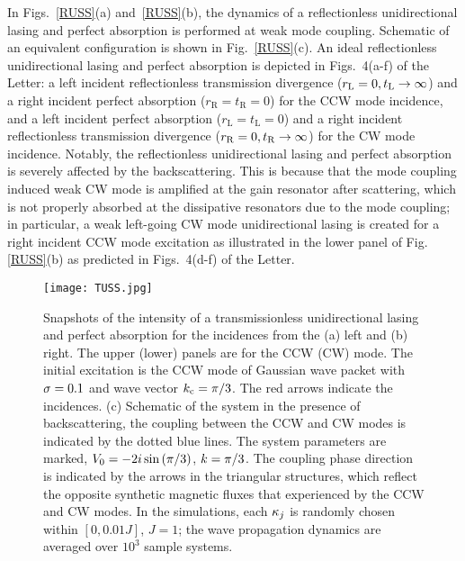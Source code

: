\documentclass[prl,showpacs,superscriptaddress,twocolumn]{revtex4-1}
\begin{document}
\begin{widetext}
In Figs.~\ref{RUSS}(a) and~\ref{RUSS}(b), the dynamics of a
reflectionless unidirectional lasing and perfect absorption is performed at
weak mode coupling. Schematic of an equivalent configuration is shown in
Fig.~\ref{RUSS}(c). An ideal reflectionless unidirectional
lasing and perfect absorption is depicted in Figs.~4(a-f) of the Letter: a
left incident reflectionless transmission divergence ($r_{\mathrm{L}}=0,t_{%
\mathrm{L}}\rightarrow \infty $) and a right incident perfect absorption ($%
r_{\mathrm{R}}=t_{\mathrm{R}}=0$) for the CCW mode incidence, and a left
incident perfect absorption ($r_{\mathrm{L}}=t_{\mathrm{L}}=0$) and a right
incident reflectionless transmission divergence ($r_{\mathrm{R}}=0,t_{%
\mathrm{R}}\rightarrow \infty $) for the CW mode incidence. Notably, the
reflectionless unidirectional lasing and perfect absorption is severely
affected by the backscattering.
This is because that the mode coupling induced weak CW mode is amplified at
the gain resonator after scattering, which is not properly absorbed at the
dissipative resonators due to the mode coupling; in particular, a weak
left-going CW mode unidirectional lasing is created for a right incident CCW
mode excitation as illustrated in the lower panel of Fig.~%
\ref{RUSS}(b) as predicted in Figs.~4(d-f) of the Letter.

\begin{figure}[thb]
\centering\texttt{[image: TUSS.jpg]}
\caption{Snapshots of the intensity of a transmissionless unidirectional lasing
and perfect absorption for the incidences from the (a) left and (b) right. The upper (lower)
panels are for the CCW (CW) mode. The initial excitation is the CCW mode of
Gaussian wave packet with $\protect\sigma =0.1$ and wave vector $k_{\mathrm{c}}=\protect\pi /3$. The red arrows indicate the incidences. (c) Schematic of the system in the
presence of backscattering, the coupling between the CCW and CW modes is
indicated by the dotted blue lines. The system parameters are marked, $V_{0}=-2i\sin \left( \protect\pi /3\right) $, $k=\protect\pi/3$. The
coupling phase direction is indicated by the arrows in the triangular
structures, which reflect the opposite synthetic magnetic fluxes that experienced by the CCW
and CW modes. In the simulations, each $\protect\kappa_j$ is randomly chosen
within $[0,0.01J]$, $J=1$; the wave propagation dynamics are averaged over $10^3$ sample
systems.} \label{TUSS}
\end{figure}


\end{widetext}
\end{document}

